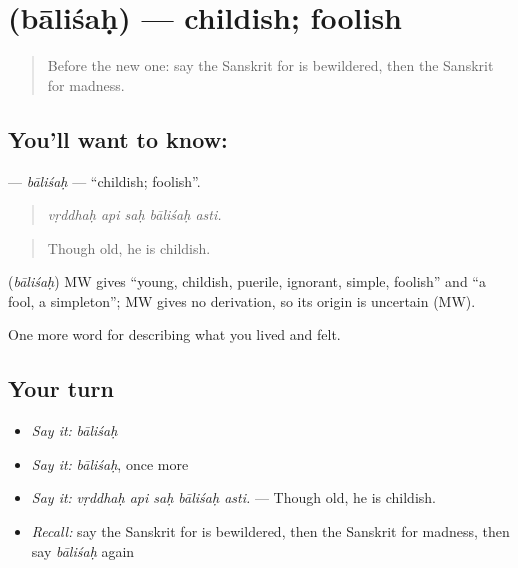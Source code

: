 \section[\texorpdfstring{\sk{बालिशः} (bāliśaḥ)}{बालिशः (bāliśaḥ)}]{ (bāliśaḥ) — childish; foolish}

\label{lesson:SA-C466-balisah}



\begin{quote}
Before the new one: say the Sanskrit for is bewildered, then the Sanskrit for madness.
\end{quote}

\subsection*{You'll want to know: }
\textbf{} — \emph{bāliśaḥ} — \textquotedblleft{}childish; foolish\textquotedblright{}.

\begin{quote}
    
\end{quote}

\begin{quote}
\emph{vṛddhaḥ api saḥ bāliśaḥ asti.}
\end{quote}

\begin{quote}
Though old, he is childish.
\end{quote}

\begin{cousinweb}
\textbf{} (\emph{bāliśaḥ}) MW gives \textquotedblleft{}young, childish, puerile, ignorant, simple, foolish\textquotedblright{} and \textquotedblleft{}a fool, a simpleton\textquotedblright{}; MW gives no derivation, so its origin is uncertain (MW).
\end{cousinweb}

\begin{grammarlens}[title={What you've built}]
One more word for describing what you lived and felt.
\end{grammarlens}

\subsection*{Your turn}
\begin{itemize}
\raggedright
  \item \emph{Say it:} \emph{bāliśaḥ}
  \item \emph{Say it:} \emph{bāliśaḥ}, once more
  \item \emph{Say it:} \emph{vṛddhaḥ api saḥ bāliśaḥ asti.} — Though old, he is childish.
  \item \emph{Recall:} say the Sanskrit for is bewildered, then the Sanskrit for madness, then say \emph{bāliśaḥ} again
\end{itemize}


